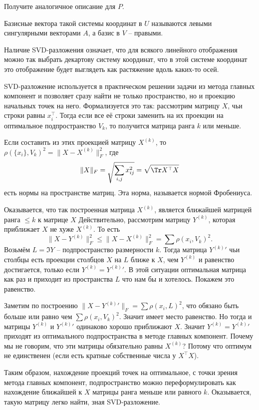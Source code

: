 \upr Получите аналогичное описание для $P$.
\eupr

\dfn Базисные вектора такой системы координат в $U$ называются левыми сингулярными векторами $A$, а базис в $V$ -- правыми.  
\edfn

Наличие SVD-разложения означает, что для всякого линейного отображения можно так выбрать декартову систему координат, что в этой системе координат это отображение будет выглядеть как растяжение вдоль каких-то осей.





SVD-разложение используется в практическом решении задачи из метода главных компонент и позволяет сразу найти не только пространство, но и проекцию начальных точек на него. Формализуется это так: рассмотрим матрицу $X$, чьи строки равны $x_i^{\top}$. Тогда если все её строки заменить на их проекции на оптимальное подпространство $V_k$, то получится матрица ранга $k$ или меньше.

Если составить из этих проекцией матрицу $X^{(k)}$, то $\rho(\{x_i\}, V_k)^2= \|X-X^{(k)}\|_F^2 $, где 
$$\|X\|_F=\sqrt{\sum_{i,j} x_{ij}^2}=\sqrt{\Tr X^{\top}X}$$
есть нормы на пространстве матриц. Эта норма, называется нормой Фробениуса.

Оказывается, что так построенная матрица $X^{(k)}$, является ближайшей матрицей ранга $\leq k$ к матрице $X$
Действительно, рассмотрим матрицу $Y^{(k)}$, которая приближает $X$ не хуже $X^{(k)}$. То есть 
$$\|X -Y^{(k)}\|_F^2 \leq \| X-X^{(k)}\|_F^2= \sum \rho(x_i, V_k)^2.$$
Возьмём $L=\Im Y$ -- подпространство размерности $k$. Тогда матрица ${Y^{(k)}}'$ чьи столбцы есть проекции столбцов $X$ на $L$ ближе к $X$, чем $Y^{(k)}$ и равенство достигается, только если $Y^{(k)}={Y^{(k)}}'$. В этой ситуации оптимальная матрица как раз и приходит из пространства $L$ что нам бы и хотелось. Покажем это равенство.

Заметим по построению $\| X - {Y^{(k)}}'\|_F = \sum \rho (x_i, L)^2$, что обязано быть больше или равно чем $\sum \rho(x_i, V_k)^2$. Значит имеет место равенство. Но тогда и матрицы $Y^{(k)}$ и ${Y^{(k)}}'$ одинаково хорошо приближают $X$. Значит $Y^{(k)}={Y^{(k)}}'$ приходят из оптимального подпространства в методе главных компонент. Почему мы не говорим, что эти матрицы обязательно равны $X^{(k)}$? Потому что оптимум не единственен (если есть кратные собственные числа у $X^\top X$).


Таким образом, нахождение проекций точек на оптимальное, с точки зрения метода главных компонент, подпространство можно переформулировать как нахождение ближайшей к $X$ матрицы ранга меньше или равного $k$. Оказывается, такую матрицу легко найти, зная SVD-разложение.

